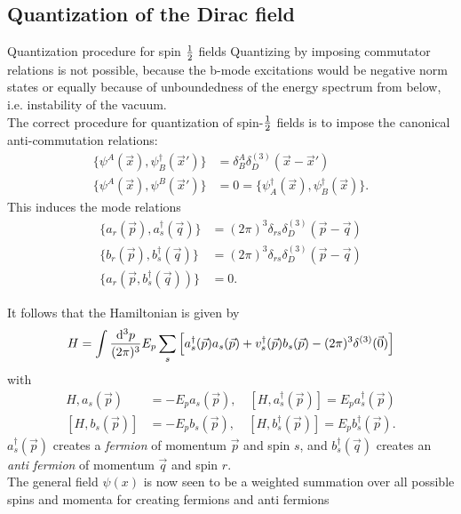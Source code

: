 \subsection{Quantization of the Dirac field}
\begin{mybox}{Quantization procedure for spin $\frac{1}{2}$ fields}
	Quantizing by imposing commutator relations is not possible, because the b-mode excitations would be negative norm states or equally because of unboundedness of the energy spectrum from below, i.e. instability of the vacuum.\\
	The correct procedure for quantization of spin-$\frac{1}{2}$ fields is to impose the canonical anti-commutation relations:
	\begin{align}
		\{\psi^A(\vec{x}), \psi^{\dagger}_B(\vec{x}') \} &= \delta^A_B \delta^{(3)}_D(\vec{x}-\vec{x}')\\
		\{\psi^A(\vec{x}), \psi^B(\vec{x}') \} &=0=\{\psi^{\dagger}_A(\vec{x}), \psi^{\dagger}_B(\vec{x}) \}.
	\end{align}
This induces the mode relations
\begin{align}
	\{a_r(\vec{p}), a^{\dagger}_s(\vec{q}) \} &= (2 \pi)^3 \delta_{rs} \delta^{(3)}_D(\vec{p}-\vec{q}) \\
	\{b_r(\vec{p}), b^{\dagger}_s(\vec{q}) \} &= (2\pi)^3 \delta_{rs} \delta^{(3)}_D(\vec{p}-\vec{q}) \\
	\{a_r(\vec{p},b^{\dagger}_s(\vec{q})) \} &=0.
\end{align}
\end{mybox}
It follows that the Hamiltonian is given by
\begin{equation}
	H=\int \frac{\mathrm{d}^3 p}{(2 \pi)^3} E_p \sum_s \left[a^{\dagger}_s(\vec{p})a_s(\vec{p} )+v^{\dagger}_s(\vec{p}) b_s(\vec{p}) -(2 \pi)^3 \delta^{(3)}(\vec{0}) \right]
\end{equation}
with 
\begin{align}
	{H,a_s(\vec{p})} &= - E_p a_s(\vec{p}),\quad [H,a^{\dagger}_s(\vec{p})] =E_p a^{\dagger}_s(\vec{p}) \\
	[H,b_s(\vec{p})] &= - E_p b_s(\vec{p}), \quad [H, b^{\dagger}_s(\vec{p})] = E_p b^{\dagger}_s(\vec{p}).
\end{align}
$a^{\dagger}_s(\vec{p})$ creates a \emph{fermion} of momentum $\vec{p}$ and spin $s$, and $b^{\dagger}_s(\vec{q})$ creates an \emph{anti fermion} of momentum $\vec{q}$ and spin $r$.\\
The general field $\psi(x)$ is now seen to be a weighted summation over all possible spins and momenta for creating fermions and anti fermions 
